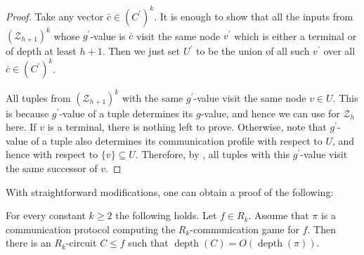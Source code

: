 \documentclass{toc}
\DeclareMathOperator{\depth}{depth}  %
\begin{document}
\begin{proof}
 Take any vector $\bar{c} \in (C^\prime)^k$. It is enough to show that all the inputs from $(\mathcal{Z}_{h + 1})^k$ whose  $g^\prime$-value is $\bar{c}$ visit the same node $v^\prime$ which is either a terminal or of depth at least $h + 1$. Then we just set $U^\prime$ to be the union of all such $v^\prime$ over all $\bar{c} \in (C^\prime)^k$.

  All tuples from $(\mathcal{Z}_{h + 1})^k$ with the same $g^\prime$-value visit the same node $v\in U$. This is because $g^\prime$-value of a tuple determines its $g$-value, and hence we can use  for $\mathcal{Z}_{h}$ here.  If $v$ is a terminal, there is nothing left to prove. Otherwise, note that $g^\prime$-value of a tuple also determines its communication profile with respect to $U$, and hence with respect to $\{v\} \subseteq U$. Therefore,  by , all tuples with this $g^\prime$-value visit the same successor of $v$.
\end{proof}

With straightforward modifications, one can obtain a proof of the following:
\begin{proposition}
\label{R_k_to_circuits}
For every constant $k\ge 2$ the following holds. Let $f\in R_k$. Assume that $\pi$ is a communication protocol computing the $R_k$-communication game for $f$. Then there is an $R_k$-circuit $C \le f$ such that $\depth(C) = O(\depth(\pi))$.
\end{proposition}
\end{document}
